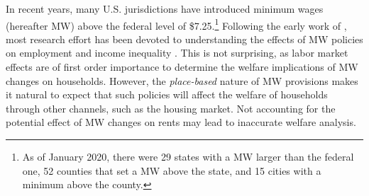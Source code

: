 
In recent years, many U.S. jurisdictions have introduced minimum wages (hereafter MW) above 
the federal level of \$7.25.\footnote{As of January 2020, there were 29 states with a MW 
	larger 	than the federal one, 52 counties that set a MW above the state, and 15 cities 
	with a minimum above the county.} %
Following the early work of \textcite{CardKrueger2000}, most research effort has been devoted 
to understanding the effects of MW policies on employment \parencite[e.g.,][]{Neumark2006, 
DubeEtAl2010, MeerWest2016, CegnizEtAl2019} and income inequality \parencite{Lee1999, 
AutorEtAl2016}. This is not surprising, as labor market effects are of first order importance 
to determine the welfare implications of MW changes on households. However, the 
\textit{place-based} nature of MW provisions makes it natural to expect that such policies 
will affect the welfare of households through other channels, such as the housing market.
Not accounting for the potential effect of MW changes on rents may lead to inaccurate 
welfare analysis.

